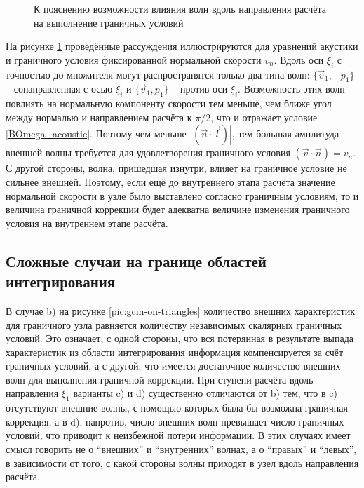 \documentclass[a4paper]{article}
\numberwithin{equation}{section}
\begin{document}
\begin{figure}[t]
	\caption{К пояснению возможности влияния волн вдоль направления расчёта на выполнение граничных условий}
	\label{pic:fixed-normal-velocity}
\end{figure}

На рисунке \ref{pic:fixed-normal-velocity} проведённые рассуждения иллюстрируются для 
уравнений акустики и граничного условия фиксированной нормальной скорости $v_n$. 
Вдоль оси $\xi_i$ с точностью до множителя могут распространятся только два типа волн:
$\{ \vec{v}_1, - p_1 \}$ -- сонаправленная с осью $\xi_i$ и 
$\{ \vec{v}_1, p_1 \}$ -- против оси $\xi_i$. 
Возможность этих волн повлиять на нормальную компоненту скорости тем меньше, чем 
ближе угол между нормалью и направлением расчёта к $\pi/2$, что и отражает условие 
\ref{BOmega_acoustic}. Поэтому чем меньше $|(\vec{n} \cdot \vec{l})|$, тем большая амплитуда 
внешней волны требуется для удовлетворения граничного условия $(\vec{v} \cdot \vec{n}) = v_n$. 
С другой стороны, волна, пришедшая изнутри, влияет на граничное условие не сильнее внешней. 
Поэтому, если ещё до внутреннего этапа расчёта значение нормальной скорости в узле 
было выставлено согласно граничным условиям, то и величина граничной коррекции будет 
адекватна величине изменения граничного условия на внутреннем этапе расчёта.


\subsection{Сложные случаи на границе областей интегрирования}
\label{bad_border_cases}
В случае b) на рисунке \ref{pic:gcm-on-triangles} 
количество внешних характеристик для граничного узла равняется количеству независимых 
скалярных граничных условий. Это означает, с одной стороны, 
что вся потерянная в результате выпада характеристик из области интегрирования информация 
компенсируется за счёт граничных условий, а с другой, 
что имеется достаточное количество внешних волн для выполнения граничной коррекции. 
При ступени расчёта вдоль направления $\xi_1$ варианты c) и d) 
существенно отличаются от b) тем, что  
в c) отсутствуют внешние волны, с помощью которых была бы возможна граничная коррекция, 
а в d), напротив, число внешних волн превышает число граничных условий, что 
приводит к неизбежной потери информации. В этих случаях имеет смысл говорить не о 
``внешних'' и ``внутренних'' волнах, а о ``правых'' и ``левых'', в зависимости от 
того, с какой стороны волны приходят в узел вдоль направления расчёта.
\end{document}
